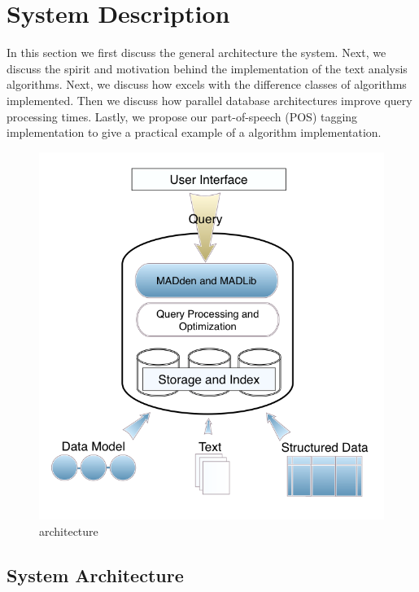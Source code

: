 
\section{System Description}

In this section we first discuss the general architecture the {\system} 
system. Next, we discuss the spirit and motivation behind the \system 
implementation of the text analysis algorithms.
Next, we discuss how \system excels with the difference classes of algorithms
implemented. 
Then we discuss how parallel database architectures improve query 
processing times.
Lastly, we propose our part-of-speech (POS) tagging implementation to 
give a practical example of a \system algorithm implementation.


\begin{figure}
   \begin{center}
        \includegraphics[scale=0.2]{content/graphics/arch.png}
        \caption{{\system} architecture}
        \label{fig:arch}
   \end{center}
\end{figure}
    
\subsection{System Architecture}

